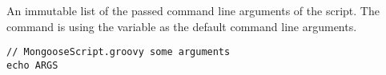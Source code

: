 %

An immutable list of the passed command line arguments of the script.
The command  is using the variable as the default command
line arguments.

\begin{lstlisting}[style=Groovybash, label={lst:example_args}]
// MongooseScript.groovy some arguments
echo ARGS
\end{lstlisting}


